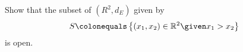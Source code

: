 \begin{problem}
  Show that the subset of $(R^2, d_E)$ given by
  \[ S \colonequals \set{(x_1, x_2) \in \R^2 \given x_1 > x_2} \]
  is open.
\end{problem}

\begin{answer}

\end{answer}
